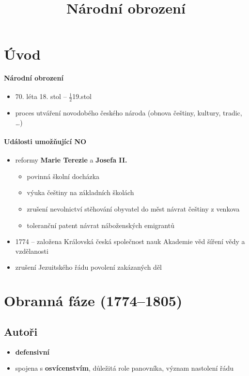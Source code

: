 \title{Národní obrození}



\section*{Úvod}
\paragraph{Národní obrození}
\begin{itemize}
\item 70. léta 18. stol -- $\frac{1}{2}$19.stol
\item proces utváření novodobého českého národa (obnova češtiny, kultury, tradic, \ldots)
\end{itemize}
\paragraph{Události umožňující NO}
\begin{itemize}
\item reformy \textbf{Marie Terezie} a \textbf{Josefa II.}
	\begin{itemize}
	\item povinná školní docházka
	\item výuka češtiny na základních školách
	\item zrušení nevolnictví \ra stěhování obyvatel do měst \ra návrat češtiny z venkova
	\item toleranční patent \ra návrat náboženských emigrantů
	\end{itemize}
\item 1774 -- založena Královská česká společnost nauk \ra Akademie věd \ra šíření vědy a vzdělanosti
\item zrušení Jezuitského řádu \ra povolení zakázaných děl
\end{itemize}

\section{Obranná fáze (1774--1805)}
\subsection{Autoři}
\begin{itemize}
\item \textbf{defensivní}
\item spojena s \textbf{osvícenstvím}, důležitá role panovníka, význam nastolení řádu
\end{itemize}

